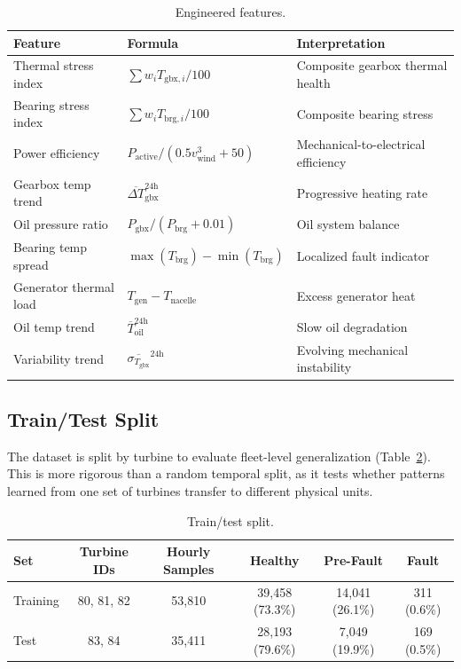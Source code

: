 \documentclass[preprint,12pt]{elsarticle}
\begin{document}
\begin{table}[H]
\centering
\caption{Engineered features.}
\label{tab:engineered_features}
\begin{tabular}{lll}
\toprule
Feature & Formula & Interpretation \\
\midrule
Thermal stress index & $\sum w_i T_{\mathrm{gbx},i} / 100$ & Composite gearbox thermal health \\
Bearing stress index & $\sum w_i T_{\mathrm{brg},i} / 100$ & Composite bearing stress \\
Power efficiency & $P_{\mathrm{active}} / (0.5 v_{\mathrm{wind}}^3 + 50)$ & Mechanical-to-electrical efficiency \\
Gearbox temp trend & $\overline{\Delta T}_{\mathrm{gbx}}^{24\mathrm{h}}$ & Progressive heating rate \\
Oil pressure ratio & $P_{\mathrm{gbx}} / (P_{\mathrm{brg}} + 0.01)$ & Oil system balance \\
Bearing temp spread & $\max(T_{\mathrm{brg}}) - \min(T_{\mathrm{brg}})$ & Localized fault indicator \\
Generator thermal load & $T_{\mathrm{gen}} - T_{\mathrm{nacelle}}$ & Excess generator heat \\
Oil temp trend & $\overline{T}_{\mathrm{oil}}^{24\mathrm{h}}$ & Slow oil degradation \\
Variability trend & $\overline{\sigma_{T_{\mathrm{gbx}}}}^{24\mathrm{h}}$ & Evolving mechanical instability \\
\bottomrule
\end{tabular}
\end{table}

\subsection{Train/Test Split}

The dataset is split by turbine to evaluate fleet-level generalization (Table~\ref{tab:train_test}). This is more rigorous than a random temporal split, as it tests whether patterns learned from one set of turbines transfer to different physical units.

\begin{table}[H]
\centering
\caption{Train/test split.}
\label{tab:train_test}
\begin{tabular}{lccccc}
\toprule
Set & Turbine IDs & Hourly Samples & Healthy & Pre-Fault & Fault \\
\midrule
Training & 80, 81, 82 & 53,810 & 39,458 (73.3\%) & 14,041 (26.1\%) & 311 (0.6\%) \\
Test & 83, 84 & 35,411 & 28,193 (79.6\%) & 7,049 (19.9\%) & 169 (0.5\%) \\
\bottomrule
\end{tabular}
\end{table}
\end{document}
